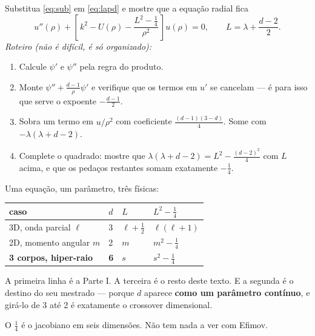 \documentclass[11pt,a4paper]{article}
\begin{document}
\begin{suavez}
Substitua \eqref{eq:sub} em \eqref{eq:lapd} e mostre que a equação radial fica
\[
u''(\rho) + \left[\,k^{2} - U(\rho) - \frac{L^{2}-\tfrac14}{\rho^{2}}\,\right]u(\rho) = 0,
\qquad
\boxed{L = \lambda + \frac{d-2}{2}}.
\]
\emph{Roteiro (não é difícil, é só organizado):}
\begin{enumerate}[label=\arabic*., itemsep=2pt, leftmargin=*]
\item Calcule $\psi'$ e $\psi''$ pela regra do produto.
\item Monte $\psi'' + \frac{d-1}{\rho}\psi'$ e verifique que os termos em $u'$ se
      cancelam --- é para isso que serve o expoente $-\tfrac{d-1}{2}$.
\item Sobra um termo em $u/\rho^{2}$ com coeficiente $\frac{(d-1)(3-d)}{4}$.
      Some com $-\lambda(\lambda+d-2)$.
\item Complete o quadrado: mostre que
      $\lambda(\lambda+d-2) = L^{2} - \frac{(d-2)^{2}}{4}$ com $L$ acima, e que os
      pedaços restantes somam exatamente $-\tfrac14$.
\end{enumerate}

\vspace{3.2cm}
\hrulefill
\end{suavez}

\begin{ideia}
Uma equação, um parâmetro, três físicas:

\vspace{0.25cm}
\begin{center}
\begin{tabular}{@{}llll@{}}
\toprule
caso & $d$ & $L$ & $L^{2}-\tfrac14$ \\
\midrule
3D, onda parcial $\ell$        & 3 & $\ell+\tfrac12$ & $\ell(\ell+1)$ \\
2D, momento angular $m$        & 2 & $m$             & $m^{2}-\tfrac14$ \\
\textbf{3 corpos, hiper-raio}  & \textbf{6} & \textbf{$s$} & \textbf{$s^{2}-\tfrac14$} \\
\bottomrule
\end{tabular}
\end{center}
\vspace{0.25cm}

A primeira linha é a Parte I. A terceira é o resto deste texto. E a segunda é o
destino do seu mestrado --- porque $d$ aparece \textbf{como um parâmetro contínuo},
e girá-lo de 3 até 2 é exatamente o crossover dimensional.

O $\tfrac14$ é o jacobiano em seis dimensões. Não tem nada a ver com Efimov.
\end{ideia}
\end{document}
